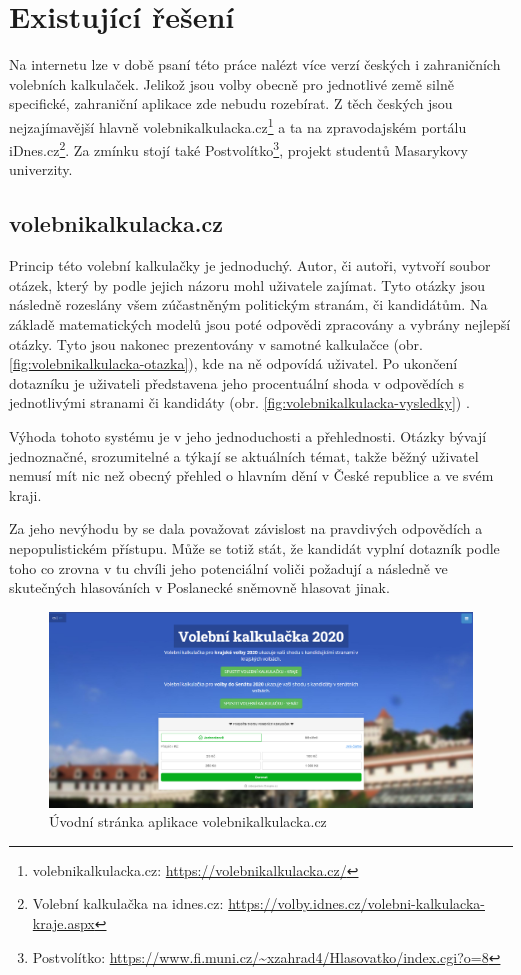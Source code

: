 \section{Existující řešení}
Na internetu lze v době psaní této práce nalézt více verzí českých i zahraničních volebních kalkulaček. Jelikož jsou volby obecně pro jednotlivé země silně specifické, zahraniční aplikace zde nebudu rozebírat. Z těch českých jsou nejzajímavější hlavně volebnikalkulacka.cz\footnote{volebnikalkulacka.cz: \url{https://volebnikalkulacka.cz/}} a ta na zpravodajském portálu iDnes.cz\footnote{Volební kalkulačka na idnes.cz: \url{https://volby.idnes.cz/volebni-kalkulacka-kraje.aspx}}. Za zmínku stojí také Postvolítko\footnote{Postvolítko: \url{https://www.fi.muni.cz/~xzahrad4/Hlasovatko/index.cgi?o=8}}, projekt studentů Masarykovy univerzity. 

\subsection{volebnikalkulacka.cz}
Princip této volební kalkulačky  je jednoduchý. Autor, či autoři, vytvoří soubor otázek, který by podle jejich názoru mohl uživatele zajímat. Tyto otázky jsou následně rozeslány všem zúčastněným politickým stranám, či kandidátům. Na základě matematických modelů jsou poté odpovědi zpracovány a vybrány nejlepší otázky. Tyto jsou nakonec prezentovány v samotné kalkulačce (obr. \ref{fig:volebnikalkulacka-otazka}), kde na ně odpovídá uživatel. Po ukončení dotazníku je uživateli představena jeho procentuální shoda v odpovědích s jednotlivými stranami či kandidáty (obr. \ref{fig:volebnikalkulacka-vysledky}) \cite{volebnikalkulacka-info}.
\par Výhoda tohoto systému je v jeho jednoduchosti a přehlednosti. Otázky bývají jednoznačné, srozumitelné a týkají se aktuálních témat, takže běžný uživatel nemusí mít nic než obecný přehled o hlavním dění v České republice a ve svém kraji. 
\par Za jeho nevýhodu by se dala považovat závislost na pravdivých odpovědích a nepopulistickém přístupu. Může se totiž stát, že kandidát vyplní dotazník podle toho co zrovna v tu chvíli jeho potenciální voliči požadují a následně ve skutečných hlasováních v Poslanecké sněmovně hlasovat jinak.
\\

\begin{figure}
    \centering
    \includegraphics[width=1\textwidth]{obrazky-figures/volebnikalkulackacz-uvod.png}
    \caption{Úvodní stránka aplikace volebnikalkulacka.cz}
    \label{fig:volebnikalkulacka-uvod}
\end{figure}

